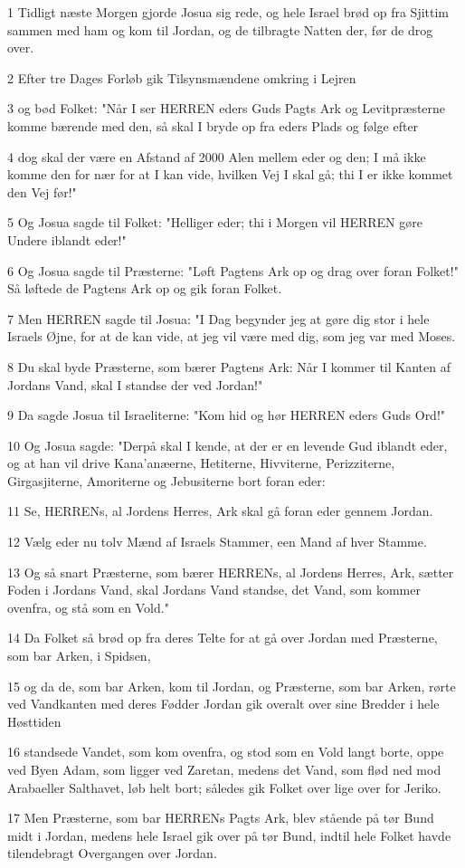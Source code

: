 \par 1 Tidligt næste Morgen gjorde Josua sig rede, og hele Israel brød op fra Sjittim sammen med ham og kom til Jordan, og de tilbragte Natten der, før de drog over.
\par 2 Efter tre Dages Forløb gik Tilsynsmændene omkring i Lejren
\par 3 og bød Folket: "Når I ser HERREN eders Guds Pagts Ark og Levitpræsterne komme bærende med den, så skal I bryde op fra eders Plads og følge efter
\par 4 dog skal der være en Afstand af 2000 Alen mellem eder og den; I må ikke komme den for nær for at I kan vide, hvilken Vej I skal gå; thi I er ikke kommet den Vej før!"
\par 5 Og Josua sagde til Folket: "Helliger eder; thi i Morgen vil HERREN gøre Undere iblandt eder!"
\par 6 Og Josua sagde til Præsterne: "Løft Pagtens Ark op og drag over foran Folket!" Så løftede de Pagtens Ark op og gik foran Folket.
\par 7 Men HERREN sagde til Josua: "I Dag begynder jeg at gøre dig stor i hele Israels Øjne, for at de kan vide, at jeg vil være med dig, som jeg var med Moses.
\par 8 Du skal byde Præsterne, som bærer Pagtens Ark: Når I kommer til Kanten af Jordans Vand, skal I standse der ved Jordan!"
\par 9 Da sagde Josua til Israeliterne: "Kom hid og hør HERREN eders Guds Ord!"
\par 10 Og Josua sagde: "Derpå skal I kende, at der er en levende Gud iblandt eder, og at han vil drive Kana'anæerne, Hetiterne, Hivviterne, Perizziterne, Girgasjiterne, Amoriterne og Jebusiterne bort foran eder:
\par 11 Se, HERRENs, al Jordens Herres, Ark skal gå foran eder gennem Jordan.
\par 12 Vælg eder nu tolv Mænd af Israels Stammer, een Mand af hver Stamme.
\par 13 Og så snart Præsterne, som bærer HERRENs, al Jordens Herres, Ark, sætter Foden i Jordans Vand, skal Jordans Vand standse, det Vand, som kommer ovenfra, og stå som en Vold."
\par 14 Da Folket så brød op fra deres Telte for at gå over Jordan med Præsterne, som bar Arken, i Spidsen,
\par 15 og da de, som bar Arken, kom til Jordan, og Præsterne, som bar Arken, rørte ved Vandkanten med deres Fødder Jordan gik overalt over sine Bredder i hele Høsttiden
\par 16 standsede Vandet, som kom ovenfra, og stod som en Vold langt borte, oppe ved Byen Adam, som ligger ved Zaretan, medens det Vand, som flød ned mod Arabaeller Salthavet, løb helt bort; således gik Folket over lige over for Jeriko.
\par 17 Men Præsterne, som bar HERRENs Pagts Ark, blev stående på tør Bund midt i Jordan, medens hele Israel gik over på tør Bund, indtil hele Folket havde tilendebragt Overgangen over Jordan.

